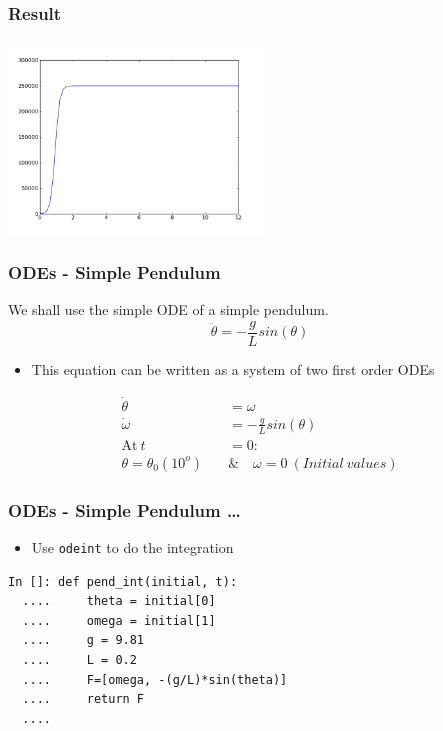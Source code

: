 \begin{frame}[fragile]
\frametitle{Result}
\begin{center}
\includegraphics[height=2in, interpolate=true]{images/epid}  
\end{center}
\end{frame}


\begin{frame}[fragile]
\frametitle{ODEs - Simple Pendulum}
We shall use the simple ODE of a simple pendulum. 
\begin{equation*}
\ddot{\theta} = -\frac{g}{L}sin(\theta)
\end{equation*}
\begin{itemize}
\item This equation can be written as a system of two first order ODEs
\end{itemize}
\begin{align}
\dot{\theta} &= \omega \\
\dot{\omega} &= -\frac{g}{L}sin(\theta) \\
 \text{At}\ t &= 0 : \nonumber \\
 \theta = \theta_0(10^o)\quad & \&\quad  \omega = 0\ (Initial\ values)\nonumber 
\end{align}
\end{frame}

\begin{frame}[fragile]
\frametitle{ODEs - Simple Pendulum \ldots}
\begin{itemize}
\item Use \texttt{odeint} to do the integration
\end{itemize}
\begin{lstlisting}
In []: def pend_int(initial, t):
  ....     theta = initial[0]
  ....     omega = initial[1]
  ....     g = 9.81
  ....     L = 0.2
  ....     F=[omega, -(g/L)*sin(theta)]
  ....     return F
  ....
\end{lstlisting}
\end{frame}

